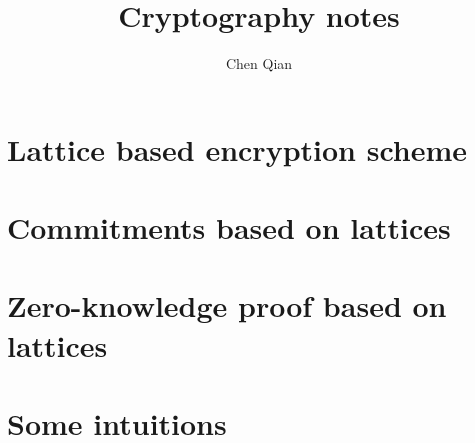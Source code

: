 \documentclass[10pt]{book}
\begin{document}
\pagestyle{plain}



\title{Cryptography notes}

\author{Chen Qian}


\maketitle

\tableofcontents

\chapter{Lattice based encryption scheme }


\chapter{Commitments based on lattices}


\chapter{Zero-knowledge proof based on lattices}




\chapter{Some intuitions}



 
\end{document}

